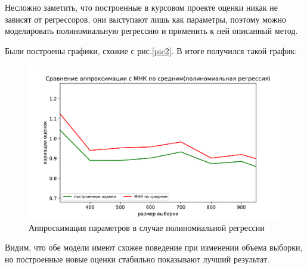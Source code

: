 Несложно заметить, что построенные в курсовом проекте оценки никак не зависят от регрессоров, они выступают лишь как параметры, поэтому можно моделировать полиномиальную регрессию и применить к ней описанный метод.

Были построены графики, схожие с рис.\ref{pic2}. В итоге получился такой график:
\begin{figure}[h!]
    \centering
    \includegraphics[width=150mm]{../images/polynomial.pdf}
    \caption{Аппроскимация параметров в случае полиномиальной регрессии\label{overflow}}
    \label{pic1}
\end{figure}

Видим, что обе модели имеют схожее поведение при изменении объема выборки, но построенные новые оценки стабильно показывают лучший результат.